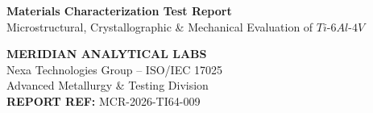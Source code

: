 \documentclass[10pt,a4paper,parskip=half]{scrartcl}
\begin{document}
\begin{tcolorbox}[
    enhanced,
    colback=brandprimary,
    colframe=brandprimary,
    arc=4pt,
    left=10pt, right=10pt, top=10pt, bottom=10pt
]
\begin{minipage}{0.62\textwidth}
    {\color{white}\LARGE\bfseries Materials Characterization Test Report}\\[3pt]
    {\color{brandsecondary!30}\normalsize Microstructural, Crystallographic \& Mechanical Evaluation of $Ti\text{-}6Al\text{-}4V$}
\end{minipage}%
\hfill
\begin{minipage}{0.34\textwidth}
    \raggedleft
    {\color{white}\small\bfseries MERIDIAN ANALYTICAL LABS}\\[2pt]
    {\color{brandlight}\scriptsize Nexa Technologies Group -- ISO/IEC 17025}\\[2pt]
    {\color{brandlight}\scriptsize Advanced Metallurgy \& Testing Division}\\[3pt]
    {\color{brandaccent}\small\textbf{REPORT REF:} MCR-2026-TI64-009}
\end{minipage}
\end{tcolorbox}

\vspace{1mm}
\end{document}
